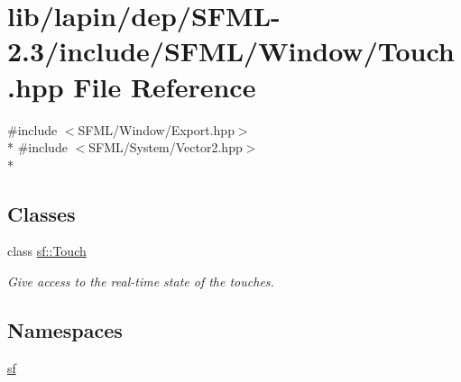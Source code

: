 \hypertarget{lapin_2dep_2_s_f_m_l-2_83_2include_2_s_f_m_l_2_window_2_touch_8hpp}{\section{lib/lapin/dep/\-S\-F\-M\-L-\/2.3/include/\-S\-F\-M\-L/\-Window/\-Touch.hpp File Reference}
\label{lapin_2dep_2_s_f_m_l-2_83_2include_2_s_f_m_l_2_window_2_touch_8hpp}
}
{\ttfamily \#include $<$S\-F\-M\-L/\-Window/\-Export.\-hpp$>$}\\*
{\ttfamily \#include $<$S\-F\-M\-L/\-System/\-Vector2.\-hpp$>$}\\*
\subsection*{Classes}
\begin{DoxyCompactItemize}
\item 
class \hyperlink{classsf_1_1_touch}{sf\-::\-Touch}
\begin{DoxyCompactList}\small\item\em Give access to the real-\/time state of the touches. \end{DoxyCompactList}\end{DoxyCompactItemize}
\subsection*{Namespaces}
\begin{DoxyCompactItemize}
\item 
\hyperlink{namespacesf}{sf}
\end{DoxyCompactItemize}
